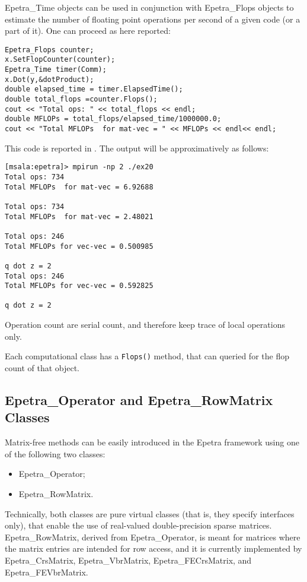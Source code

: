 Epetra\_Time objects can be used in conjunction with Epetra\_Flops
objects to estimate the number of floating point operations per second
of a given code (or a part of it). One can proceed as here reported:
\begin{verbatim}
Epetra_Flops counter;
x.SetFlopCounter(counter);
Epetra_Time timer(Comm);
x.Dot(y,&dotProduct);
double elapsed_time = timer.ElapsedTime();
double total_flops =counter.Flops();
cout << "Total ops: " << total_flops << endl;
double MFLOPs = total_flops/elapsed_time/1000000.0;
cout << "Total MFLOPs  for mat-vec = " << MFLOPs << endl<< endl;
\end{verbatim}
This code is reported in . The output will be
approximatively as follows:
\begin{verbatim}
[msala:epetra]> mpirun -np 2 ./ex20
Total ops: 734
Total MFLOPs  for mat-vec = 6.92688

Total ops: 734
Total MFLOPs  for mat-vec = 2.48021

Total ops: 246
Total MFLOPs for vec-vec = 0.500985

q dot z = 2
Total ops: 246
Total MFLOPs for vec-vec = 0.592825

q dot z = 2
\end{verbatim}

\begin{remark} Operation count are serial count, and therefore keep
  trace of local operations only.
\end{remark}

\begin{remark}
  Each computational class has a \verb!Flops()! method, that can queried
  for the flop count of that object.
\end{remark}



\subsection{Epetra\_Operator and Epetra\_RowMatrix Classes}
\label{sec:operator}

Matrix-free methods can be easily introduced in the Epetra framework
using one of the following two classes:
\begin{itemize}
\item Epetra\_Operator;
\item Epetra\_RowMatrix.
\end{itemize}
Technically, both classes are pure virtual classes (that is, they
specify interfaces only), that enable the use of real-valued
double-precision sparse matrices. Epetra\_RowMatrix, derived from
Epetra\_Operator, is meant for matrices where the matrix entries are
intended for row access, and it is currently implemented by
Epetra\_CrsMatrix, Epetra\_VbrMatrix, Epetra\_FECrsMatrix, and
Epetra\_FEVbrMatrix.


